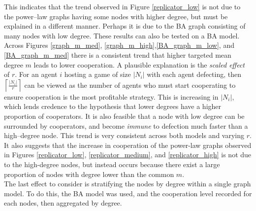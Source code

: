This indicates that the trend observed in Figure \ref{replicator_low} is not due to the power--law graphs having some nodes with higher degree, but must be explained in a different manner. Perhaps it is due to the BA graph consisting of many nodes with low degree. These results can also be tested on a BA model. \\
\FloatBarrier
{}
\FloatBarrier
{}
\FloatBarrier
Across Figures \ref{graph_m_med}, \ref{graph_m_high},\ref{BA_graph_m_low}, and \ref{BA_graph_m_med} there is a consistent trend that higher targeted mean degree $m$ leads to lower cooperation. A plausible explanation is the \emph{scaled effect} of $r$. For an agent $i$ hosting a game of size $|N_i|$ with each agent defecting, then $\left\lceil \frac{|N_i|}{r}\right\rceil$ can be viewed as the number of agents who must start cooperating to ensure cooperation is the most profitable strategy. This is increasing in $|N_i|$, which lends credence to the hypothesis that lower degrees have a higher proportion of cooperators. It is also feasible that a node with low degree can be surrounded by cooperators, and become \emph{immune} to defection much faster than a high--degree node. This trend is very consistent across both models and varying $r$. \\

It also suggests that the increase in cooperation of the power-law graphs observed in Figures \ref{replicator_low}, \ref{replicator_medium}, and \ref{replicator_high} is not due to the high-degree nodes, but instead occurs because there exist a large proportion of nodes with degree lower than the common $m$.  \\

The last effect to consider is stratifying the nodes by degree within a single graph model. To do this, the BA model was used, and the cooperation level recorded for each nodes, then aggregated by degree. \\

